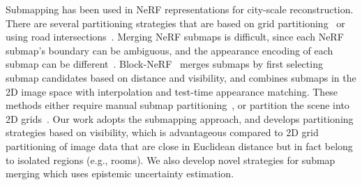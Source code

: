 Submapping has been used in NeRF representations for city-scale reconstruction. There are several partitioning strategies that are based on grid partitioning~\cite{meganerf} or using road intersections~\cite{tancik2022block}. Merging NeRF submaps is difficult, since each NeRF submap's boundary can be ambiguous, and the appearance encoding of each submap can be different~\cite{martinbrualla2020nerfw}. %
Block-NeRF~\cite{tancik2022block} merges submaps by first selecting submap candidates based on distance and visibility, and combines submaps in the 2D image space with interpolation and test-time appearance matching. These methods either require manual submap partitioning~\cite{tancik2022block}, or partition the scene into 2D grids~\cite{meganerf}. Our work adopts the submapping approach, and develops partitioning strategies based on visibility, which is advantageous compared to 2D grid partitioning of image data that are close in Euclidean distance but in fact belong to isolated regions (e.g., rooms). We also develop novel strategies for submap merging which uses epistemic uncertainty estimation. 





